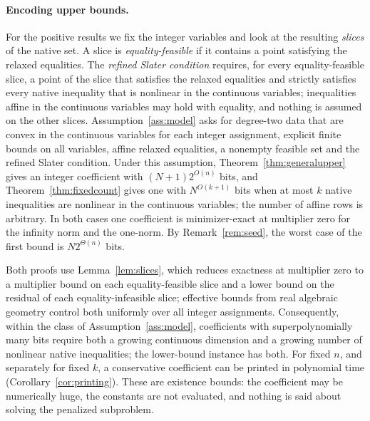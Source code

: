 \paragraph{Encoding upper bounds.}
For the positive results we fix the integer variables and look at the
resulting \emph{slices} of the native set. A slice is
\emph{equality-feasible} if it contains a point satisfying the relaxed
equalities. The \emph{refined Slater condition} requires, for every
equality-feasible slice, a point of the slice that satisfies the relaxed
equalities and strictly satisfies every native inequality that is
nonlinear in the continuous variables; inequalities affine in the
continuous variables may hold with equality, and nothing is assumed on
the other slices. Assumption~\ref{ass:model} asks for degree-two data
that are convex in the continuous variables for each integer
assignment, explicit finite bounds on all variables, affine relaxed
equalities, a nonempty feasible set and the refined Slater condition.
Under this assumption, Theorem~\ref{thm:generalupper} gives an integer
coefficient with $(N+1)2^{O(n)}$ bits, and
Theorem~\ref{thm:fixedcount} gives one with $N^{O(k+1)}$ bits when at
most $k$ native inequalities are nonlinear in the continuous variables;
the number of affine rows is arbitrary. In both cases one coefficient
is minimizer-exact at multiplier zero for the infinity norm and the
one-norm. By Remark~\ref{rem:seed}, the worst case of the first bound
is $N2^{\Theta(n)}$ bits.

Both proofs use Lemma~\ref{lem:slices}, which reduces exactness at
multiplier zero to a multiplier bound on each equality-feasible slice
and a lower bound on the residual of each equality-infeasible slice;
effective bounds from real algebraic geometry control both uniformly
over all integer assignments. Consequently, within the class of
Assumption~\ref{ass:model}, coefficients with superpolynomially many
bits require both a growing continuous dimension and a growing number
of nonlinear native inequalities; the lower-bound instance has both.
For fixed $n$, and separately for fixed $k$, a conservative coefficient
can be printed in polynomial time (Corollary~\ref{cor:printing}). These
are existence bounds: the coefficient may be numerically huge, the
constants are not evaluated, and nothing is said about solving the
penalized subproblem.

